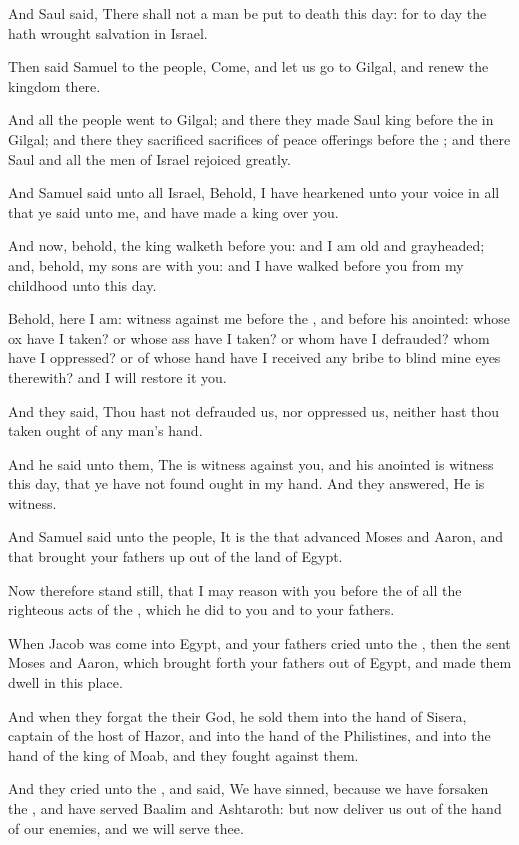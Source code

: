 \Verse And Saul said, There shall not a man be put to death this day: for to day the \LORD hath wrought salvation in Israel.

\Verse Then said Samuel to the people, Come, and let us go to Gilgal, and renew the kingdom there.

\Verse And all the people went to Gilgal; and there they made Saul king before the \LORD in Gilgal; and there they sacrificed sacrifices of peace offerings before the \LORD; and there Saul and all the men of Israel rejoiced greatly.


\Chapter
\Verse And Samuel said unto all Israel, Behold, I have hearkened unto your voice in all that ye said unto me, and have made a king over you.

\Verse And now, behold, the king walketh before you: and I am old and grayheaded; and, behold, my sons are with you: and I have walked before you from my childhood unto this day.

\Verse Behold, here I am: witness against me before the \LORD, and before his anointed: whose ox have I taken? or whose ass have I taken? or whom have I defrauded? whom have I oppressed? or of whose hand have I received any bribe to blind mine eyes therewith? and I will restore it you.

\Verse And they said, Thou hast not defrauded us, nor oppressed us, neither hast thou taken ought of any man's hand.

\Verse And he said unto them, The \LORD is witness against you, and his anointed is witness this day, that ye have not found ought in my hand.  And they answered, He is witness.

\Verse And Samuel said unto the people, It is the \LORD that advanced Moses and Aaron, and that brought your fathers up out of the land of Egypt.

\Verse Now therefore stand still, that I may reason with you before the \LORD of all the righteous acts of the \LORD, which he did to you and to your fathers.

\Verse When Jacob was come into Egypt, and your fathers cried unto the \LORD, then the \LORD sent Moses and Aaron, which brought forth your fathers out of Egypt, and made them dwell in this place.

\Verse And when they forgat the \LORD their God, he sold them into the hand of Sisera, captain of the host of Hazor, and into the hand of the Philistines, and into the hand of the king of Moab, and they fought against them.

\Verse And they cried unto the \LORD, and said, We have sinned, because we have forsaken the \LORD, and have served Baalim and Ashtaroth: but now deliver us out of the hand of our enemies, and we will serve thee.

